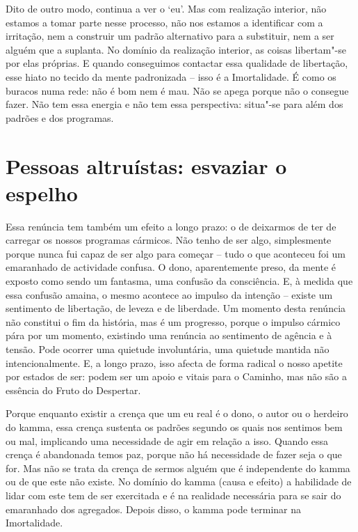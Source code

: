 Dito de outro modo, continua a ver o `eu'. Mas com realização interior, não
estamos a tomar parte nesse processo, não nos estamos a identificar com a
irritação, nem a construir um padrão alternativo para a substituir, nem a ser
alguém que a suplanta. No domínio da realização interior, as coisas libertam"-se
por elas próprias. E quando conseguimos contactar essa qualidade de libertação,
esse hiato no tecido da mente padronizada -- isso é a Imortalidade. É como os
buracos numa rede: não é bom nem é mau. Não se apega porque não o consegue
fazer. Não tem essa energia e não tem essa perspectiva: situa"-se para além dos
padrões e dos programas.

\section{Pessoas altruístas: esvaziar o espelho}

Essa renúncia tem também um efeito a longo prazo: o de deixarmos de ter de
carregar os nossos programas cármicos. Não tenho de ser algo, simplesmente
porque nunca fui capaz de ser algo para começar -- tudo o que aconteceu foi um
emaranhado de actividade confusa. O dono, aparentemente preso, da mente é
exposto como sendo um fantasma, uma confusão da consciência. E, à medida que
essa confusão amaina, o mesmo acontece ao impulso da intenção -- existe um
sentimento de libertação, de leveza e de liberdade. Um momento desta renúncia
não constitui o fim da história, mas é um progresso, porque o impulso cármico
pára por um momento, existindo uma renúncia ao sentimento de agência e à tensão.
Pode ocorrer uma quietude involuntária, uma quietude mantida não
intencionalmente. E, a longo prazo, isso afecta de forma radical o nosso apetite
por estados de ser: podem ser um apoio e vitais para o Caminho, mas não são a
essência do Fruto do Despertar.

Porque enquanto existir a crença que um eu real é o dono, o autor ou o herdeiro
do kamma, essa crença sustenta os padrões segundo os quais nos sentimos bem ou
mal, implicando uma necessidade de agir em relação a isso. Quando essa crença é
abandonada temos paz, porque não há necessidade de fazer seja o que for. Mas não
se trata da crença de sermos alguém que é independente do kamma ou de que este
não existe. No domínio do kamma (causa e efeito) a habilidade de lidar com este
tem de ser exercitada e é na realidade necessária para se sair do emaranhado dos
agregados. Depois disso, o kamma pode terminar na Imortalidade.

